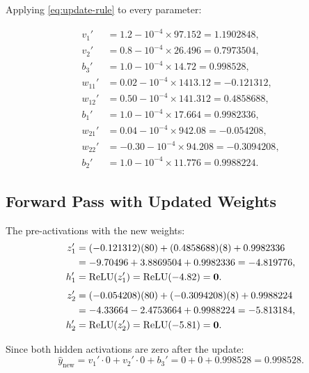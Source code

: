 \documentclass[12pt,a4paper]{article}
\newcommand{\ReLU}{\operatorname{ReLU}}
\newcommand{\yhat}{\hat{y}}
\begin{document}
Applying \cref{eq:update-rule} to every parameter:

\begin{align}
  v_1'  &= 1.2 - 10^{-4} \times 97.152  = 1.1902848, \label{eq:v1-new}\\
  v_2'  &= 0.8 - 10^{-4} \times 26.496  = 0.7973504, \label{eq:v2-new}\\
  b_3'  &= 1.0 - 10^{-4} \times 14.72   = 0.998528,  \label{eq:b3-new}\\[4pt]
  w_{11}' &= 0.02  - 10^{-4} \times 1413.12 = -0.121312,  \label{eq:w11-new}\\
  w_{12}' &= 0.50  - 10^{-4} \times 141.312 =  0.4858688, \label{eq:w12-new}\\
  b_1'    &= 1.0   - 10^{-4} \times 17.664  =  0.9982336, \label{eq:b1-new}\\[4pt]
  w_{21}' &= 0.04  - 10^{-4} \times 942.08  = -0.054208,  \label{eq:w21-new}\\
  w_{22}' &= -0.30 - 10^{-4} \times 94.208  = -0.3094208, \label{eq:w22-new}\\
  b_2'    &= 1.0   - 10^{-4} \times 11.776  =  0.9988224. \label{eq:b2-new}
\end{align}

\subsection{Forward Pass with Updated Weights}

The pre-activations with the new weights:
\begin{align}
  z_1' &= (-0.121312)(80) + (0.4858688)(8) + 0.9982336 \notag\\
       &= -9.70496 + 3.8869504 + 0.9982336 = -4.819776, \label{eq:z1-new}\\
  h_1' &= \ReLU(z_1') = \ReLU(-4.82) = \mathbf{0}. \label{eq:h1-new}
\end{align}
\begin{align}
  z_2' &= (-0.054208)(80) + (-0.3094208)(8) + 0.9988224 \notag\\
       &= -4.33664 - 2.4753664 + 0.9988224 = -5.813184, \label{eq:z2-new}\\
  h_2' &= \ReLU(z_2') = \ReLU(-5.81) = \mathbf{0}. \label{eq:h2-new}
\end{align}

Since both hidden activations are zero after the update:
\begin{equation}
  \yhat_{\text{new}} = v_1' \cdot 0 + v_2' \cdot 0 + b_3'
                     = 0 + 0 + 0.998528 = 0.998528.
  \label{eq:yhat-new}
\end{equation}
\end{document}
